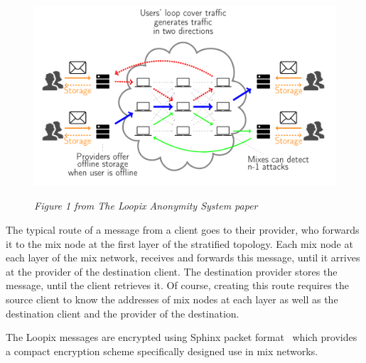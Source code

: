 \documentclass[a4paper,11pt,oneside]{report}
\begin{document}
\begin{figure}[H]
    \centering
    \includegraphics[width=0.8\linewidth]{plots/loopix.png}
    \caption{}
    \label{fig:loopix}
    \small\textit{Figure 1 from The Loopix Anonymity System paper~\cite{loopix}}
\end{figure}

The typical route of a message from a client goes to their provider, who forwards it to the mix node at the first layer of the stratified topology. Each mix node at each layer of the mix network, receives and forwards this message, until it arrives at the provider of the destination client. The destination provider stores the message, until the client retrieves it. Of course, creating this route requires the source client to know the addresses of mix nodes at each layer as well as the destination client and the provider of the destination.

The Loopix messages are encrypted using Sphinx packet format~\cite{sphinx} which provides a compact encryption scheme specifically designed use in mix networks.
\end{document}
